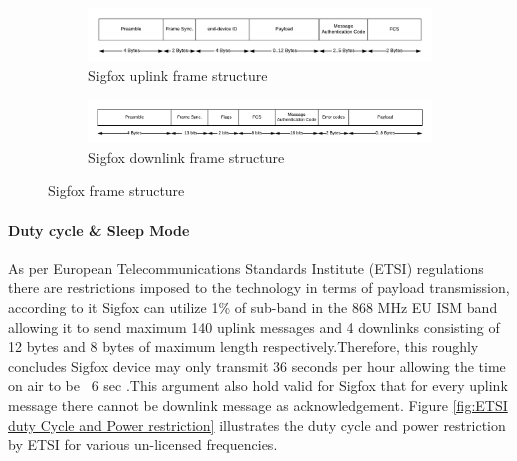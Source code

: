\documentclass[12pt]{article}
\begin{document}
\begin{figure}[h]
\begin{subfigure}[t]{\columnwidth}
  \centering
  \includegraphics[width=.8\columnwidth]{Images/SigfoxUplinkFrame.pdf}  \caption{Sigfox uplink frame structure }
\end{subfigure}

\begin{subfigure}[t]{\columnwidth}
  \centering
  \includegraphics[width=0.8\columnwidth]{Images/SigfoxDownlinkFrame.pdf}  
  \caption{Sigfox downlink frame structure}
\end{subfigure}

\caption{Sigfox frame structure}
\label{Fig:Sigfox frame structure}
\end{figure}


\begin{table}[]
\caption{Sigfox offerings and limitations across it's subscription plans}
\centering
{}

\label{sigfoxplan}
\end{table}

\paragraph{Duty cycle \& Sleep Mode}
As per European Telecommunications Standards Institute (ETSI) regulations there are restrictions imposed to the technology in terms of payload transmission, according to it Sigfox can utilize 1\% of sub-band in the 868 MHz EU ISM band \cite{etsi2012electromagnetic} allowing it to send maximum 140 uplink messages and 4 downlinks consisting of 12 bytes and 8 bytes of maximum length respectively.Therefore, this roughly concludes Sigfox device may only transmit 36 seconds per hour allowing the time on air to be ~6 sec \cite{vejlgaard2017coverage}.This argument also hold valid for Sigfox that for every uplink message there cannot be downlink message as acknowledgement. Figure \ref{fig:ETSI duty Cycle and Power restriction} illustrates the duty cycle and power restriction by ETSI for various un-licensed frequencies.\\
\end{document}
